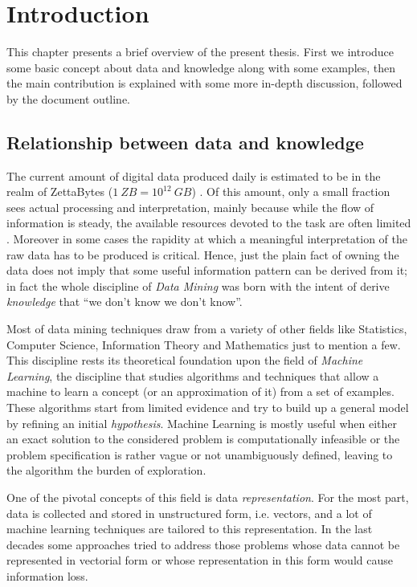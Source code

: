 
\chapter{Introduction} %
\label{Chapter1} %

This chapter presents a brief overview of the present thesis.
First we introduce some basic concept about data and knowledge along with some examples,
then the main contribution is explained with some more in-depth discussion,
followed by the document outline.

\section{Relationship between data and knowledge}

The current amount of digital data produced daily is estimated to be in the realm of 
ZettaBytes ($1~ZB = 10^{12}~GB$) \cite{idc}.
Of this amount, only a small fraction sees actual processing and interpretation,
mainly because while the flow of information is steady, the available resources
devoted to the task are often limited \cite{idc}.
Moreover in some cases the rapidity at which a meaningful interpretation of the 
raw data has to be produced is critical.
Hence, just the plain fact of owning the data does not imply that some useful 
information pattern can be derived from it; in fact the whole discipline of \emph{Data Mining}
was born with the intent of derive \emph{knowledge} that ``we don't know we don't know''.

Most of data mining techniques draw from a variety of other fields like Statistics,
Computer Science, Information Theory and Mathematics just to mention a few.
This discipline rests its theoretical foundation upon the field of \emph{Machine Learning},
the discipline that studies algorithms and techniques that allow a machine
to learn a concept (or an approximation of it) from a set of examples.
These algorithms start from limited evidence and try to build up a general model
by refining an initial \emph{hypothesis}.
Machine Learning is mostly useful when either an exact solution to the considered
problem is computationally infeasible or the problem specification
is rather vague or not unambiguously defined, leaving to the algorithm the burden
of exploration.

One of the pivotal concepts of this field is data \emph{representation}.
For the most part, data is collected and stored in unstructured form, i.e. vectors,
and a lot of machine learning techniques are tailored to this representation.
In the last decades some approaches tried to address those problems whose data cannot
be represented in vectorial form or whose representation in this form would cause
information loss.

